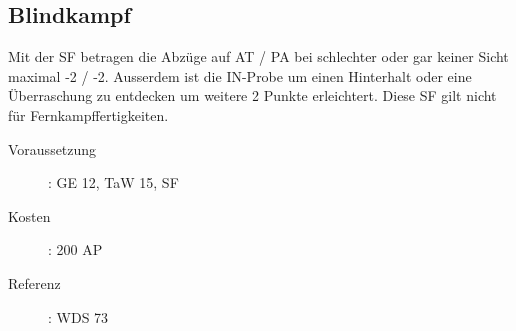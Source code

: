 \subsection{Blindkampf}
\label{sf.blindkampf}
Mit der SF  betragen die Abzüge auf AT / PA bei schlechter oder gar keiner Sicht maximal -2 / -2.
Ausserdem ist die IN-Probe um einen Hinterhalt oder eine Überraschung zu entdecken um weitere 2 Punkte erleichtert.
Diese SF gilt nicht für Fernkampffertigkeiten.

\begin{description}
    \item[Voraussetzung]:
        GE 12, TaW  15, SF 
    \item [Kosten]:
        200 AP
    \item [Referenz]:
        WDS 73
\end{description}
